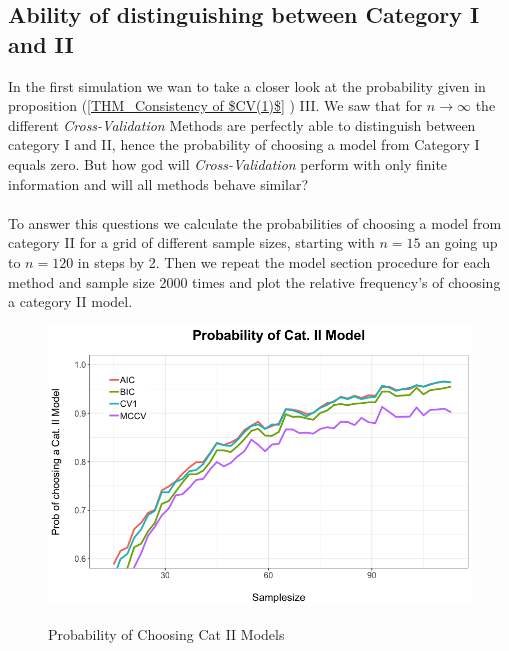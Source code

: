 \documentclass[Research_Module_ES.tex]{subfiles}
\begin{document}
\subsection{Ability of distinguishing between Category I and II }
In the first simulation we wan to take a closer look at the probability given in proposition (\ref{THM_Consistency of $CV(1)$} ) III. We saw that for $n\to\infty$ the different \textit{Cross-Validation} Methods are perfectly able to distinguish between category I and II, hence the probability of choosing a model from Category I equals zero. But how god will \textit{Cross-Validation} perform with only finite information and will all methods behave similar?\\
\\
To answer this questions we calculate the probabilities of choosing a model from category II for a grid of different sample sizes, starting with $n=15$ an going up to $n=120$ in steps by 2. Then we repeat the model section procedure for each method and sample size 2000 times and plot the relative frequency's of choosing a category II model.
\begin{figure}[h]
	\centering
	\includegraphics[width=1\textwidth]{Simulation1.png}\\
\caption{Probability of Choosing Cat II Models}
\end{figure}\\
\end{document}
